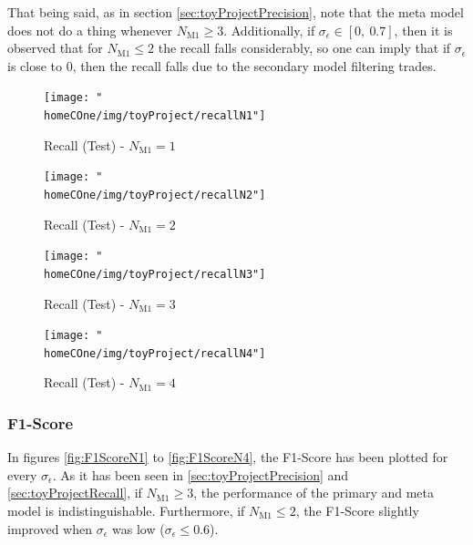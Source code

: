 \documentclass[a4paper]{article}
\newcommand{\homeCOne}{../../Chapter 1 - Metalabeling/Draft}
\begin{document}
That being said, as in section \ref{sec:toyProjectPrecision}, note 
that the meta model does not do a thing whenever $N_{\text{M1}} \geq 
3$. Additionally, if $\sigma_\epsilon \in [0,\ 0.7]$, then it is 
observed that for $N_{\text{M1}} \leq 2$ the recall falls 
considerably, so one can imply that if $\sigma_\epsilon$ is close to 
0, then the recall falls due to the secondary model filtering trades.

\begin{figure}[htbp]
\centering
	\begin{minipage}{.5\textwidth}
	\centering
		\texttt{[image: "\\homeCOne/img/toyProject/recallN1"]}
	  	\caption{Recall (Test) - $N_{\text{M1}} = 1$}
	  	\label{fig:recallN1}
	\end{minipage}%
	\begin{minipage}{.5\textwidth}
	\centering
		\texttt{[image: "\\homeCOne/img/toyProject/recallN2"]}
		\caption{Recall (Test) - $N_{\text{M1}} = 2$}
		\label{fig:recallN2}
	\end{minipage}

	\vspace{.5cm}

	\begin{minipage}{.5\textwidth}
	\centering
		\texttt{[image: "\\homeCOne/img/toyProject/recallN3"]}
		\caption{Recall (Test) - $N_{\text{M1}} = 3$}
		\label{fig:recallN3}
	\end{minipage}%
	\begin{minipage}{.5\textwidth}
	\centering
		\texttt{[image: "\\homeCOne/img/toyProject/recallN4"]}
		\caption{Recall (Test) - $N_{\text{M1}} = 4$}
		\label{fig:recallN4}
	\end{minipage}
\end{figure}

\subsubsection{F1-Score}
\label{sec:toyProjectF1Score}
In figures \ref{fig:F1ScoreN1} to \ref{fig:F1ScoreN4}, the F1-Score 
has been plotted for every $\sigma_\epsilon$. As it has been seen in 
\ref{sec:toyProjectPrecision} and \ref{sec:toyProjectRecall}, if 
$N_{\text{M1}} \geq 3$, the performance of the primary and meta model 
is indistinguishable. Furthermore, if $N_{\text{M1}} \leq 2$, the 
F1-Score slightly improved when $\sigma_\epsilon$ was low 
($\sigma_\epsilon \leq 0.6$).
\end{document}
